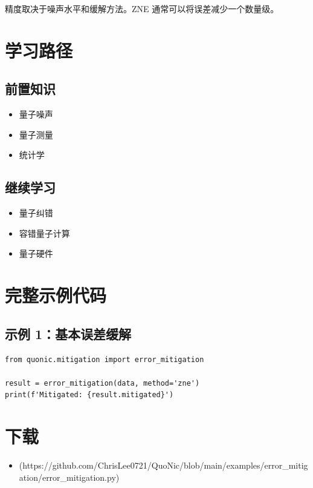 \documentclass[12pt,a4paper]{article}
\begin{document}
精度取决于噪声水平和缓解方法。ZNE 通常可以将误差减少一个数量级。

\section{学习路径}

\subsection{前置知识}
\begin{itemize}
  \item 量子噪声
  \item 量子测量
  \item 统计学
\end{itemize}

\subsection{继续学习}
\begin{itemize}
  \item 量子纠错
  \item 容错量子计算
  \item 量子硬件
\end{itemize}

\section{完整示例代码}

\subsection{示例 1：基本误差缓解}

\begin{verbatim}
from quonic.mitigation import error_mitigation

result = error_mitigation(data, method='zne')
print(f'Mitigated: {result.mitigated}')
\end{verbatim}

\section{下载}

\begin{itemize}
  \item [error\_mitigation.py](https://github.com/ChrisLee0721/QuoNic/blob/main/examples/error_mitigation/error_mitigation.py)
\end{itemize}
\end{document}
